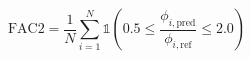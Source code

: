 \documentclass[12pt]{article}
\begin{document}
\begin{equation*}
\text{FAC2} = \frac{1}{N}\sum_{i=1}^{N} \mathbb{1}\!\left(0.5 \leq \frac{\phi_{i,\text{pred}}}{\phi_{i,\text{ref}}} \leq 2.0\right)
\end{equation*}
\end{document}
